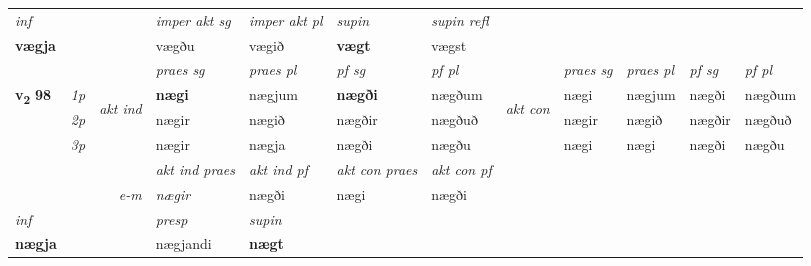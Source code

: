 \begin{longtable}[l]{X>{\footnotesize\itshape}llXXXXlXXXX}
   {\textit{inf}} & &  & \textit{imper akt sg} & \textit{imper akt pl}    & \textit{supin} & \textit{supin refl}  \\*
  {\textbf{vægja}} & && vægðu  & vægið    &  \textbf{vægt} & vægst  \\*

\midrule

 & &   & \textit{praes sg}  & \textit{praes pl}    & \textit{ pf sg} & \textit{pf pl} & & \textit{praes sg}  & \textit{praes pl}    & \textit{pf sg} & \textit{pf pl }  \\ \cmidrule{4-7} \cmidrule{9-12}
 \multirow{2}{*}{{{\textbf{v{\textsubscript{2}}} \Large{\textbf{98}}}}}  & 1p & \multirow{3}{*}{\begin{turn}{90}\textit{akt ind}\end{turn}} & \textbf{nægi} & nægjum & \textbf{nægði} & nægðum & \multirow{3}{*}{\begin{turn}{90}\textit{akt con}\end{turn}} &nægi & nægjum & nægði & nægðum\\*
 & 2p &  &  nægir  & nægið & nægðir & nægðuð & & nægir & nægið & nægðir & nægðuð \\*
 & 3p &  & nægir & nægja & nægði & nægðu & & nægi & nægi& nægði & nægðu \\*
\cmidrule{4-7} \cmidrule{9-12}

   && &  \textit{akt ind praes} & \textit{akt ind pf} & \textit{akt con praes} & \textit{akt con pf} \\*
\multicolumn{3}{r}{\textit{e-m}} & nægir & nægði & nægi & nægði \\*

\cmidrule{4-7}
   {\textit{inf}} & &     & \textit{presp} & \textit{supin}   \\*
  {\textbf{nægja}} & &     & nægjandi &  \textbf{nægt}   \\*
\midrule


\end{longtable}
